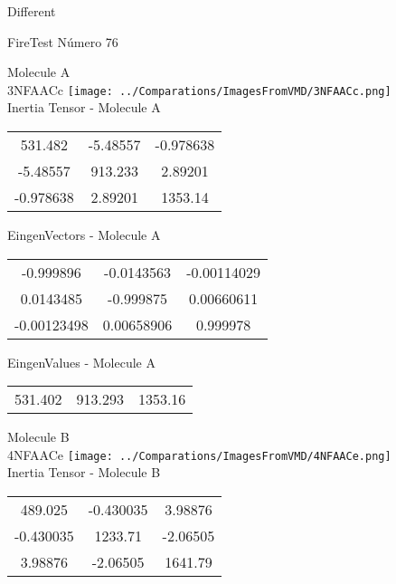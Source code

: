 \begin{center}
\vtab
\vtab
\textcolor{NavyBlue}{\Large Different}
\end{center}

 \newpage

\vtab[-2cm]
\begin{center}
{\large FireTest \tab Número 76}
\end{center}
\begin{multicols}{2}
\begin{center}

Molecule A \\ 
3NFAACc
\texttt{[image: ../Comparations/ImagesFromVMD/3NFAACc.png]}
\\
Inertia Tensor - Molecule A \\
\vtab

\begin{tabular}{|c c c|}
531.482	 & 	-5.48557	 & 	-0.978638	 \\
-5.48557	 & 	913.233	 & 	2.89201	 \\
-0.978638	 & 	2.89201	 & 	1353.14
\end{tabular}

\vtab
 EingenVectors - Molecule A     \\
\vtab
\begin{tabular}{|c c c|}
-0.999896	 & 	-0.0143563	 & 	-0.00114029	 \\
0.0143485	 & 	-0.999875	 & 	0.00660611	 \\
-0.00123498	 & 	0.00658906	 & 	0.999978
\end{tabular}

\vtab
 EingenValues - Molecule A     \\
\vtab
\begin{tabular}{|c c c|}
531.402	 & 	913.293	 & 	1353.16	 \\
\end{tabular}
\columnbreak

Molecule B \\ 
4NFAACe
\texttt{[image: ../Comparations/ImagesFromVMD/4NFAACe.png]}
\\
Inertia Tensor - Molecule B \\
\vtab

\begin{tabular}{|c c c|}
489.025	 & 	-0.430035	 & 	3.98876	 \\
-0.430035	 & 	1233.71	 & 	-2.06505	 \\
3.98876	 & 	-2.06505	 & 	1641.79
\end{tabular}


\end{center}
\end{multicols}
